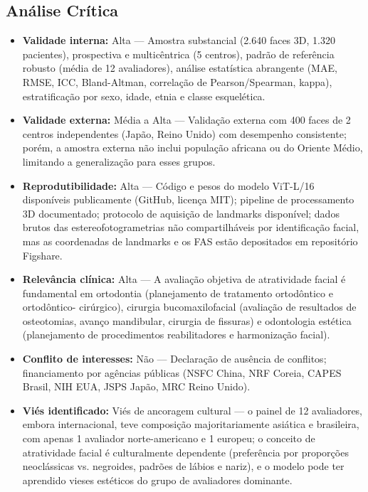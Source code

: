 \subsection{Análise Crítica}
\begin{itemize}
  \item \textbf{Validade interna:} Alta --- Amostra substancial (2.640
        faces 3D, 1.320 pacientes), prospectiva e multicêntrica (5
        centros), padrão de referência robusto (média de 12
        avaliadores), análise estatística abrangente (MAE, RMSE,
        ICC, Bland-Altman, correlação de Pearson/Spearman, kappa),
        estratificação por sexo, idade, etnia e classe esquelética.
  \item \textbf{Validade externa:} Média a Alta --- Validação externa
        com 400 faces de 2 centros independentes (Japão, Reino
        Unido) com desempenho consistente; porém, a amostra externa
        não inclui população africana ou do Oriente Médio, limitando
        a generalização para esses grupos.
  \item \textbf{Reprodutibilidade:} Alta --- Código e pesos do modelo
        ViT-L/16 disponíveis publicamente (GitHub, licença MIT);
        pipeline de processamento 3D documentado; protocolo de
        aquisição de landmarks disponível; dados brutos das
        estereofotogrametrias não compartilháveis por identificação
        facial, mas as coordenadas de landmarks e os FAS estão
        depositados em repositório Figshare.
  \item \textbf{Relevância clínica:} Alta --- A avaliação objetiva
        de atratividade facial é fundamental em ortodontia
        (planejamento de tratamento ortodôntico e ortodôntico-
        cirúrgico), cirurgia bucomaxilofacial (avaliação de
        resultados de osteotomias, avanço mandibular, cirurgia de
        fissuras) e odontologia estética (planejamento de
        procedimentos reabilitadores e harmonização facial).
  \item \textbf{Conflito de interesses:} Não --- Declaração de
        ausência de conflitos; financiamento por agências públicas
        (NSFC China, NRF Coreia, CAPES Brasil, NIH EUA, JSPS Japão,
        MRC Reino Unido).
  \item \textbf{Viés identificado:} Viés de ancoragem cultural ---
        o painel de 12 avaliadores, embora internacional, teve
        composição majoritariamente asiática e brasileira, com
        apenas 1 avaliador norte-americano e 1 europeu; o conceito
        de atratividade facial é culturalmente dependente
        (preferência por proporções neoclássicas vs. negroides,
        padrões de lábios e nariz), e o modelo pode ter aprendido
        vieses estéticos do grupo de avaliadores dominante.
\end{itemize}

